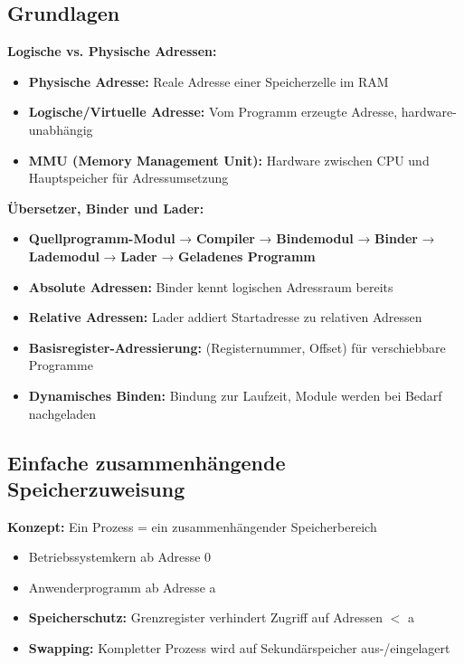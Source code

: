 \documentclass[9pt,a4paper]{extarticle}
\begin{document}
\begin{multicols*}{2}
\subsection{Grundlagen}
\textbf{Logische vs. Physische Adressen:}
\begin{itemize}
\item \textbf{Physische Adresse:} Reale Adresse einer Speicherzelle im RAM
\item \textbf{Logische/Virtuelle Adresse:} Vom Programm erzeugte Adresse, hardware-unabhängig
\item \textbf{MMU (Memory Management Unit):} Hardware zwischen CPU und Hauptspeicher für Adressumsetzung
\end{itemize}

\textbf{Übersetzer, Binder und Lader:}
\begin{itemize}
\item \textbf{Quellprogramm-Modul} → \textbf{Compiler} → \textbf{Bindemodul} → \textbf{Binder} → \textbf{Lademodul} → \textbf{Lader} → \textbf{Geladenes Programm}
\item \textbf{Absolute Adressen:} Binder kennt logischen Adressraum bereits
\item \textbf{Relative Adressen:} Lader addiert Startadresse zu relativen Adressen
\item \textbf{Basisregister-Adressierung:} (Registernummer, Offset) für verschiebbare Programme
\item \textbf{Dynamisches Binden:} Bindung zur Laufzeit, Module werden bei Bedarf nachgeladen
\end{itemize}

\subsection{Einfache zusammenhängende Speicherzuweisung}
\textbf{Konzept:} Ein Prozess = ein zusammenhängender Speicherbereich
\begin{itemize}
\item Betriebssystemkern ab Adresse 0
\item Anwenderprogramm ab Adresse a
\item \textbf{Speicherschutz:} Grenzregister verhindert Zugriff auf Adressen $<$ a
\item \textbf{Swapping:} Kompletter Prozess wird auf Sekundärspeicher aus-/eingelagert
\end{itemize}


\end{multicols*}
\end{document}
